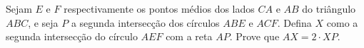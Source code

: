 Sejam $E$ e $F$ respectivamente os pontos médios dos lados $CA$ e $AB$ do triângulo $ABC$, e seja $P$ a segunda intersecção dos círculos $ABE$ e $ACF$.
Defina $X$ como a segunda intersecção do círculo $AEF$ com a reta $AP$.
Prove que $AX = 2 \cdot XP$.
